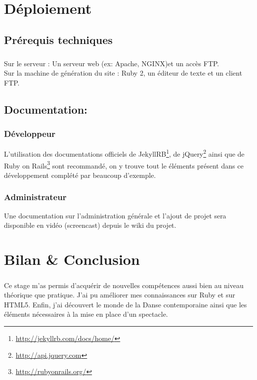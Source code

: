 \documentclass[11pt,a4paper,twoside]{report}
\begin{document}
\chapter{Déploiement}
	\section{Prérequis techniques}
		\paragraph{}Sur le serveur : Un serveur web (ex: Apache, NGINX)et un accès FTP.\\
		Sur la machine de génération du site : Ruby 2, un éditeur de texte et un client FTP.
	\section{Documentation:}
		\subsection{Développeur}L'utilisation des documentations officiels de JekyllRB\footnote{\url{http://jekyllrb.com/docs/home/}}, de jQuery\footnote{\url{http://api.jquery.com}} ainsi que de Ruby on Rails\footnote{\url{http://rubyonrails.org/}} sont recommandé, on y trouve tout le éléments présent dans ce développement complété par beaucoup d'exemple.
		\subsection{Administrateur}Une documentation sur l'administration générale et l'ajout de projet sera disponible en vidéo (screencast) depuis le wiki du projet.

\chapter{Bilan \& Conclusion}
	\paragraph*{}Ce stage m'as permis d'acquérir de nouvelles compétences aussi bien au niveau théorique que pratique. J'ai pu améliorer mes connaissances sur Ruby et sur HTML5. Enfin, j'ai découvert le monde de la Danse contemporaine ainsi que les éléments nécessaires à la mise en place d'un spectacle.
\end{document}
